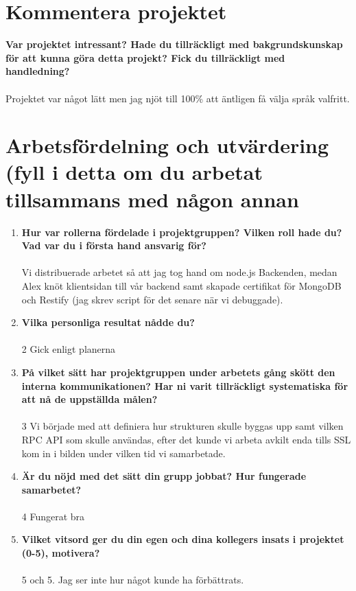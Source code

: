 \documentclass[swedish,a4paper]{article}
\title{\TITLE}
\author{\AUTHOR}
\begin{document}
\maketitle

\section{Kommentera projektet}
\textbf{Var projektet intressant? Hade du tillräckligt med bakgrundskunskap för att kunna göra detta projekt? Fick du tillräckligt med handledning?}
\\
\\
Projektet var något lätt men jag njöt till 100\% att äntligen få välja språk
valfritt.

\section{Arbetsfördelning och utvärdering (fyll i detta om du arbetat tillsammans med
någon annan}

\begin{enumerate}
  \item \textbf{Hur var rollerna fördelade i projektgruppen? Vilken roll hade du? Vad var du i första hand ansvarig för?}\\
    \\
    Vi distribuerade arbetet så att jag tog hand om node.js Backenden, medan
    Alex knöt klientsidan till vår backend samt skapade certifikat för MongoDB
    och Restify (jag skrev script för det senare när vi debuggade).
  \item \textbf{Vilka personliga resultat nådde du?}\\
    \\
    2 Gick enligt planerna
  \item \textbf{På vilket sätt har projektgruppen under arbetets gång skött den
    interna kommunikationen? Har ni varit tillräckligt systematiska för att nå
  de uppställda målen?} \\
    \\
    3 Vi började med att definiera hur strukturen skulle byggas upp samt
    vilken RPC API som skulle användas, efter det kunde vi arbeta avkilt enda
    tills SSL kom in i bilden under vilken tid vi samarbetade.
  \item \textbf{Är du nöjd med det sätt din grupp jobbat? Hur fungerade
    samarbetet?}\\
    \\
    4 Fungerat bra
  \item \textbf{Vilket vitsord ger du din egen och dina kollegers insats i
    projektet (0-5), motivera?}\\
    \\
    5 och 5. Jag ser inte hur något kunde ha förbättrats.
\end{enumerate}
\end{document}
